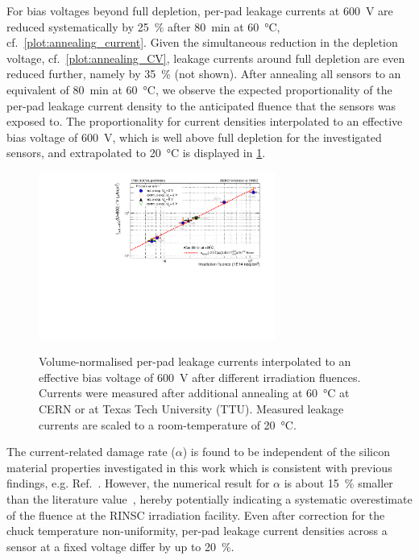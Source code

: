 For bias voltages beyond full depletion, per-pad leakage currents at \SI{600}{\volt} are reduced systematically by \SI{25}{\percent} after \SI{80}{\minute} at \SI{60}{\celsius}, cf.~\ref{plot:annealing_current}.
Given the simultaneous reduction in the depletion voltage, cf.~\ref{plot:annealing_CV}, leakage currents around full depletion are even reduced further, namely by \SI{35}{\percent} (not shown).
After annealing all sensors to an equivalent of \SI{80}{\minute} at \SI{60}{\celsius}, we observe the expected proportionality of the per-pad leakage current density to the anticipated fluence that the sensors was exposed to.
The proportionality for current densities interpolated to an effective bias voltage of \SI{600}{\volt}, which is well above full depletion for the investigated sensors, and extrapolated to \SI{20}{\celsius} is displayed in \ref{plot:alpha_600}.
\begin{figure}
	\captionsetup[subfigure]{aboveskip=-1pt,belowskip=-1pt}
	\centering
    \includegraphics[width=0.69\textwidth]{plots/alpha/alpha_600V.pdf}
    \label{plot:alpha_600}
	\caption{
	    Volume-normalised per-pad leakage currents interpolated to an effective bias voltage of \SI{600}{\volt} after different irradiation fluences.
        Currents were measured after additional annealing at \SI{60}{\celsius} at CERN or at Texas Tech University (TTU).
		Measured leakage currents are scaled to a room-temperature of \SI{20}{\celsius}.
	}
\end{figure}
The current-related damage rate ($\alpha$) is found to be independent of the silicon material properties investigated in this work which is consistent with previous findings, e.g. Ref.~\cite{MOLL199987}.
However, the numerical result for $\alpha$ is about \SI{15}{\percent} smaller than the literature value~\cite{moll:SiDamages}, hereby potentially indicating a systematic overestimate of the fluence at the RINSC irradiation facility. 
Even after correction for the chuck temperature non-uniformity, per-pad leakage current densities across a sensor at a fixed voltage differ by up to \SI{20}{\percent}.
